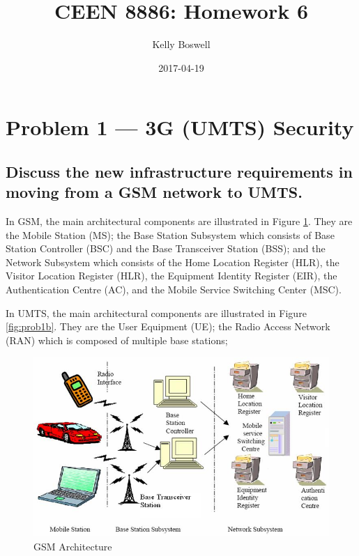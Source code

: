 \documentclass[a4paper]{report}
\title{CEEN 8886: Homework 6}
\date{2017-04-19}
\author{Kelly Boswell}
\begin{document}
\maketitle


\newpage


\section{Problem 1 --- 3G (UMTS) Security}

\subsection{Discuss the new infrastructure requirements in moving from a GSM
            network to UMTS.}

In GSM, the main architectural components are illustrated in Figure \ref{fig:prob1a}.
They are the Mobile Station (MS); the Base Station Subsystem which consists of Base Station
Controller (BSC) and the Base Transceiver Station (BSS); and the Network Subsystem
which consists of the Home Location Register (HLR), the Visitor Location Register
(HLR), the Equipment Identity Register (EIR), the Authentication Centre (AC), and
the Mobile Service Switching Center (MSC).

In UMTS, the main architectural components are illustrated in Figure \ref{fig:prob1b}.
They are the User Equipment (UE); the Radio Access Network (RAN) which is composed of multiple
base stations; 

\begin{figure}
\begin{mdframed}
\includegraphics[scale=0.2]{GSM_Architecture.png}
\caption{GSM Architecture}
\label{fig:prob1a}
\end{mdframed}
\end{figure}
\end{document}
